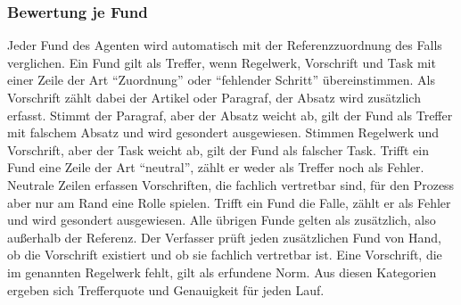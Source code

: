 \subsubsection{Bewertung je Fund}
Jeder Fund des Agenten wird automatisch mit der Referenzzuordnung des Falls verglichen.
Ein Fund gilt als Treffer, wenn Regelwerk, Vorschrift und Task mit einer Zeile der Art \enquote{Zuordnung} oder \enquote{fehlender Schritt} übereinstimmen.
Als Vorschrift zählt dabei der Artikel oder Paragraf, der Absatz wird zusätzlich erfasst.
Stimmt der Paragraf, aber der Absatz weicht ab, gilt der Fund als Treffer mit falschem Absatz und wird gesondert ausgewiesen.
Stimmen Regelwerk und Vorschrift, aber der Task weicht ab, gilt der Fund als falscher Task.
Trifft ein Fund eine Zeile der Art \enquote{neutral}, zählt er weder als Treffer noch als Fehler.
Neutrale Zeilen erfassen Vorschriften, die fachlich vertretbar sind, für den Prozess aber nur am Rand eine Rolle spielen.
Trifft ein Fund die Falle, zählt er als Fehler und wird gesondert ausgewiesen.
Alle übrigen Funde gelten als zusätzlich, also außerhalb der Referenz.
Der Verfasser prüft jeden zusätzlichen Fund von Hand, ob die Vorschrift existiert und ob sie fachlich vertretbar ist.
Eine Vorschrift, die im genannten Regelwerk fehlt, gilt als erfundene Norm.
Aus diesen Kategorien ergeben sich Trefferquote und Genauigkeit für jeden Lauf.
